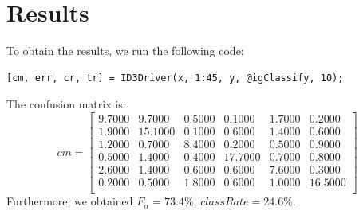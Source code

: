 \documentclass[11pt]{amsart}
\begin{document}
\section{Results}
To obtain the results, we run the following code:
\begin{lstlisting}
[cm, err, cr, tr] = ID3Driver(x, 1:45, y, @igClassify, 10);
\end{lstlisting}
The confusion matrix is:
$$
cm = \left[\begin{array}{cccccc}
9.7000   & 9.7000 &   0.5000 &   0.1000 &   1.7000    &0.2000 \\
    1.9000   &15.1000&    0.1000&    0.6000&    1.4000 &   0.6000 \\
    1.2000    &0.7000    &8.4000    &0.2000    &0.5000   & 0.9000 \\
    0.5000    &1.4000    &0.4000   &17.7000   & 0.7000   & 0.8000 \\
    2.6000    &1.4000    &0.6000    &0.6000    &7.6000    &0.3000 \\
    0.2000    &0.5000    &1.8000    &0.6000    &1.0000   &16.5000 \\
\end{array}
\right]
$$
Furthermore, we obtained $F_{\alpha} = 73.4\%$, $classRate = 24.6\%$.

    
\end{document}
